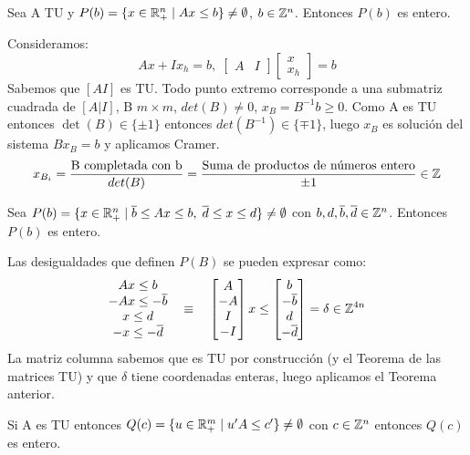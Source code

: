 \documentclass[PM.tex]{subfiles}
\begin{document}
\begin{theorem}
Sea A TU y $P(b)=\{x \in \mathbb{R}^n_+ \mid Ax\leq b\} \neq \emptyset$, $b\in \mathbb{Z}^n$. Entonces $P(b)$ es entero.
\end{theorem}
\begin{dem}Consideramos:
\[
Ax +Ix_h = b, \; \begin{bmatrix} A & I \end{bmatrix} \begin{bmatrix}
x\\
x_h
\end{bmatrix} = b
\]
Sabemos que $[A I]$ es TU. Todo punto extremo corresponde a una submatriz cuadrada de $[A | I]$, B $m\times m$, $det(B)\neq 0$, $x_B=B^{-1}b\geq 0$. Como A es TU entonces $\det(B)\in\{\pm1\}$ entonces $det(B^{-1})\in\{\mp1\}$, luego $x_B$ es solución del sistema $Bx_B=b$ y aplicamos Cramer.
\[
x_{B_i}=\frac{\text{B completada con b}}{det(B)}=\frac{\text{Suma de productos de números entero}}{\pm1} \in \mathbb{Z}
\]\QED
\end{dem}
\begin{coro} Sea $P(b)=\{x \in \mathbb{R}^n_+ \mid \overline{b}\leq Ax\leq b,\; \overline{d}\leq x \leq d\} \neq \emptyset$ con $b,d,\overline{b},\overline{d}\in\mathbb{Z}^n$. Entonces $P(b)$ es entero.
\end{coro}
\begin{dem}
Las desigualdades que definen $P(B)$ se pueden expresar como:
\[
\begin{matrix}
Ax \leq b\\
-Ax\leq -\overline{b}\\
x\leq d\\
-x\leq -\overline{d}
\end{matrix}\quad
\equiv\quad
\begin{bmatrix}
A\\
-A\\
I\\
-I
\end{bmatrix}
x\leq
\begin{bmatrix}
b\\
-\overline{b}\\
d\\
-\overline{d}
\end{bmatrix} = \delta \in \mathbb{Z}^{4n}
\]
La matriz columna sabemos que es TU por construcción (y el Teorema de las matrices TU) y que $\delta$ tiene coordenadas enteras, luego aplicamos el Teorema anterior.\QED
\end{dem}
\begin{coro}
Si A es TU entonces $Q(c) = \{u\in\mathbb{R}^m_+ \mid u'A\leq c'\}\neq\emptyset$ con $c\in\mathbb{Z}^n$ entonces $Q(c)$ es entero.
\end{coro}
\end{document}
